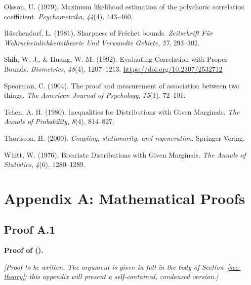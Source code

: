 \documentclass[
  12pt,
]{article}
\newlength{\cslhangindent}
\newenvironment{CSLReferences}[2] %
 {\begin{list}{}{%
  \setlength{\itemindent}{0pt}
  \setlength{\leftmargin}{0pt}
  \setlength{\parsep}{0pt}
  \ifodd #1
   \setlength{\leftmargin}{\cslhangindent}
   \setlength{\itemindent}{-1\cslhangindent}
  \fi
  \setlength{\itemsep}{#2\baselineskip}}}
 {\end{list}}
\theoremstyle{plain}
\theoremstyle{definition}
\theoremstyle{remark}
\begin{document}
\begin{CSLReferences}{1}{0}
Olsson, U. (1979). Maximum likelihood estimation of the polychoric
correlation coefficient. \emph{Psychometrika}, \emph{44}(4), 443--460.

Rüschendorf, L. (1981). Sharpness of {Fréchet} bounds. \emph{Zeitschrift
Für Wahrscheinlichkeitstheorie Und Verwandte Gebiete}, \emph{57},
293--302.

Shih, W. J., \& Huang, W.-M. (1992). Evaluating {Correlation} with
{Proper Bounds}. \emph{Biometrics}, \emph{48}(4), 1207--1213.
\url{https://doi.org/10.2307/2532712}

Spearman, C. (1904). The proof and measurement of association between
two things. \emph{The American Journal of Psychology}, \emph{15}(1),
72--101.

Tchen, A. H. (1980). Inequalities for {Distributions} with {Given
Marginals}. \emph{The Annals of Probability}, \emph{8}(4), 814--827.

Thorisson, H. (2000). \emph{Coupling, stationarity, and regeneration}.
Springer-Verlag.

Whitt, W. (1976). Bivariate {Distributions} with {Given Marginals}.
\emph{The Annals of Statistics}, \emph{4}(6), 1280--1289.

\end{CSLReferences}

\newpage

\appendix

\section{Appendix A: Mathematical
Proofs}\label{appendix-a-mathematical-proofs}

\subsection{Proof A.1}\label{proof-max-product}

\textbf{Proof of
().}

\emph{{[}Proof to be written. The argument is given in full in the body
of Section~\ref{sec-theory}; this appendix will present a
self-contained, condensed version.{]}}
\end{document}
